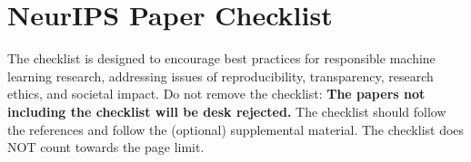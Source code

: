 \documentclass[numbers]{article}
\begin{document}

\newpage
\section*{NeurIPS Paper Checklist}

The checklist is designed to encourage best practices for responsible machine learning research, addressing issues of reproducibility, transparency, research ethics, and societal impact. Do not remove the checklist: {\bf The papers not including the checklist will be desk rejected.} The checklist should follow the references and follow the (optional) supplemental material.  The checklist does NOT count towards the page
limit. 
\end{document}
